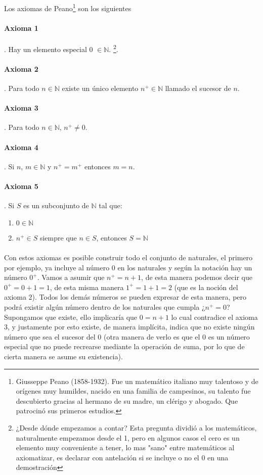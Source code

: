 \documentclass{article}
\begin{document}
Los axiomas de Peano\footnote{Giusseppe Peano (1858-1932). Fue un matemático italiano muy talentoso y de orígenes muy humildes, nacido en una familia de campesinos, su talento fue descubierto gracias al hermano de su madre, un clérigo y abogado. Que patrocinó sus primeros estudios.} son los siguientes\cite{tnumprincip_2004}

\paragraph{Axioma 1}. Hay un elemento especial 0 $\in \mathbb{N}$. \footnote{¿Desde dónde empezamos a contar? Esta pregunta dividió a los matemáticos, naturalmente empezamos desde el 1, pero en algunos casos el cero es un elemento muy conveniente a tener, lo mas "sano" entre matemáticos al axiomatizar, es declarar con antelación si se incluye o no el 0 en una demostración}.
\paragraph{Axioma 2}. Para todo $n \in \mathbb{N}$ existe un único elemento $n^+ \in \mathbb{N}$ llamado el sucesor de $n$.
\paragraph{Axioma 3}. Para todo $n \in \mathbb{N}$, $n^+ \neq 0$.
\paragraph{Axioma 4}. Si $n$, $m \in \mathbb{N}$ y $n^+ = m^+$ entonces $m = n$.
\paragraph{Axioma 5}. Si $S$ es un subconjunto de $\mathbb{N}$ tal que:
\begin{enumerate}
    \item $0 \in \mathbb{N}$
    \item $n^+ \in S$ siempre que $n \in S$, entonces $S = \mathbb{N}$
\end{enumerate}

\paragraph{} Con estos axiomas es posible construir todo el conjunto de naturales, el primero por ejemplo, ya incluye al número $0$ en los naturales y según la notación hay un número $0^+$. Vamos a asumir que $n^+ = n + 1$,  de esta manera podemos decir que $0^+ = 0 + 1 = 1$, de esta misma manera $1^+ = 1 + 1 = 2$ (que es la noción del axioma 2). Todos los demás números se pueden expresar de esta manera, pero podrá existir algún número dentro de los naturales que cumpla ¿$n^+ = 0$? Supongamos que existe, ello implicaría que $0 = n + 1$ lo cual contradice el axioma 3, y justamente por esto existe, de manera implícita, indica que no existe ningún número que sea el sucesor del 0 (otra manera de verlo es que el 0 es un número especial que no puede recrearse mediante la operación de suma, por lo que de cierta manera se asume su existencia).
\end{document}
